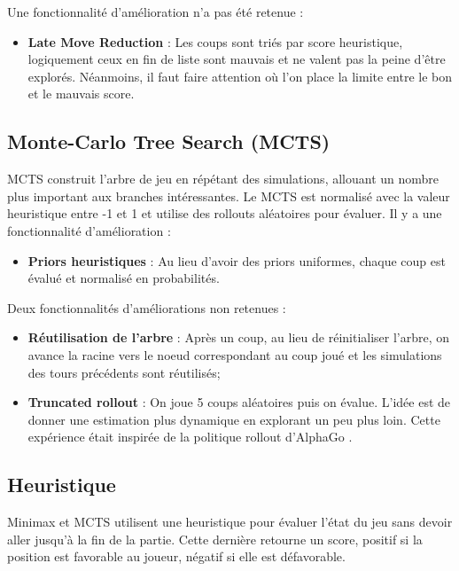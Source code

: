 \documentclass[a4paper,11pt]{article}
\begin{document}
Une fonctionnalité d'amélioration n'a pas été retenue :
\begin{itemize}[nosep]
	\item \textbf{Late Move Reduction} : Les coups sont triés par score heuristique, logiquement ceux en fin de liste sont mauvais et ne valent pas la peine d'être explorés. Néanmoins, il faut faire attention où l'on place la limite entre le bon et le mauvais score.
\end{itemize}


\subsection{Monte-Carlo Tree Search (MCTS)}
MCTS construit l'arbre de jeu en répétant des simulations, allouant un nombre plus important aux branches intéressantes.
Le MCTS est normalisé avec la valeur heuristique entre -1 et 1 et utilise des rollouts aléatoires pour évaluer. Il y a une fonctionnalité d'amélioration :
\begin{itemize}[nosep]
	\item \textbf{Priors heuristiques} : Au lieu d'avoir des priors uniformes, chaque coup est évalué et normalisé en probabilités.
\end{itemize}

Deux fonctionnalités d'améliorations non retenues :
\begin{itemize}[nosep]
	\item \textbf{Réutilisation de l'arbre} : Après un coup, au lieu de réinitialiser l'arbre, on avance la racine vers le noeud correspondant au coup joué et les simulations des tours précédents sont réutilisés;
	\item \textbf{Truncated rollout} : On joue 5 coups aléatoires puis on évalue. L'idée est de donner une estimation plus dynamique en explorant un peu plus loin. Cette expérience était inspirée de la politique rollout d'AlphaGo \citep{silver2016mastering}.
\end{itemize}

\subsection{Heuristique}
Minimax et MCTS utilisent une heuristique pour évaluer l'état du jeu sans devoir aller jusqu'à la fin de la partie. Cette dernière retourne un score, positif si la position est favorable au joueur, négatif si elle est défavorable.
\end{document}

